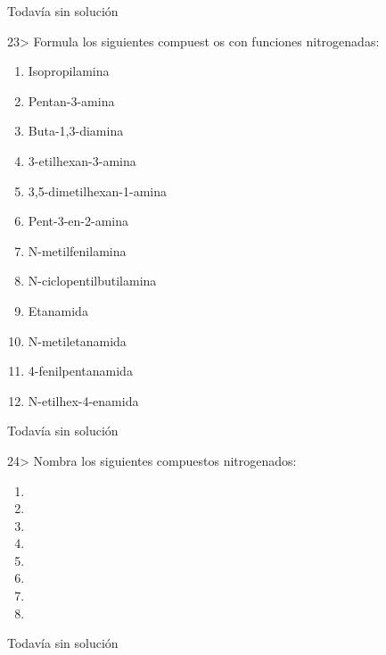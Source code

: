 \documentclass[twocolumn]{article}
\begin{document}
\begin{solution}[print=false]
  Todavía sin solución
\end{solution}

\begin{exercise}
  23> Formula los siguientes compuest os con funciones nitrogenadas:
  \begin{enumerate}
    \item Isopropilamina
    \item Pentan-3-amina
    \item Buta-1,3-diamina
    \item 3-etilhexan-3-amina
    \item 3,5-dimetilhexan-1-amina
    \item Pent-3-en-2-amina
    \item N-metilfenilamina
    \item N-ciclopentilbutilamina
    \item Etanamida
    \item N-metiletanamida
    \item 4-fenilpentanamida
    \item N-etilhex-4-enamida
  \end{enumerate}
\end{exercise}

\begin{solution}[print=false]
  Todavía sin solución
\end{solution}

\begin{exercise}
  24> Nombra los siguientes compuestos nitrogenados:
  \begin{enumerate}
    \item {}
    \item {}
    \item {}
    \item {}
    \item {}
    \item {}
    \item {}
    \item {}
  \end{enumerate}
\end{exercise}

\begin{solution}[print=false]
  Todavía sin solución
\end{solution}
\end{document}
